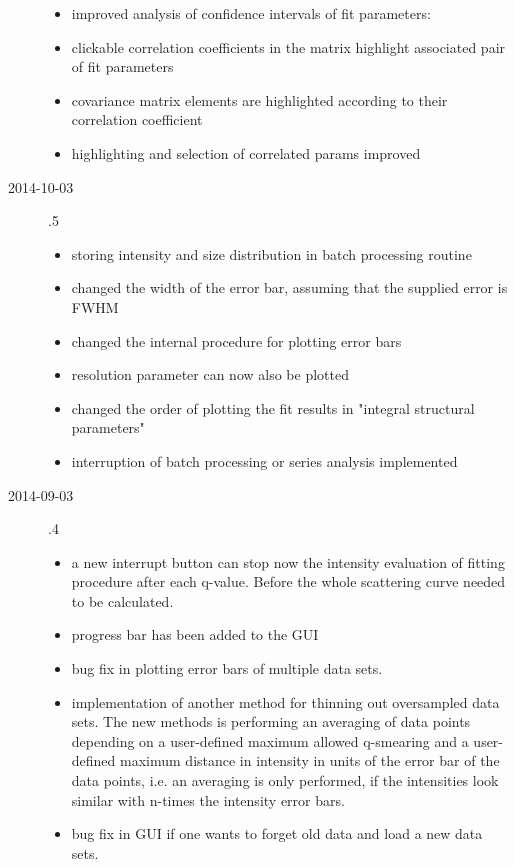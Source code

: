 \begin{description}
\begin{itemize}
        \item improved analysis of confidence intervals of fit parameters:
        \item clickable correlation coefficients in the matrix highlight associated
             pair of fit parameters
        \item covariance matrix elements are highlighted according to their correlation
            coefficient
        \item highlighting and selection of correlated params improved
    \end{itemize}
\item[2014-10-03] .5
    \begin{itemize}
        \item storing intensity and size distribution in batch processing routine
        \item changed the width of the error bar, assuming that the supplied error is FWHM
        \item changed the internal procedure for plotting error bars
        \item resolution parameter can now also be plotted
        \item changed the order of plotting the fit results
            in "integral structural parameters"
        \item interruption of batch processing or series analysis implemented
    \end{itemize}
\item[2014-09-03] .4
    \begin{itemize}
    \item a new interrupt button can stop now the intensity evaluation of fitting
        procedure after each q-value. Before the whole scattering curve needed to be
        calculated.
    \item progress bar has been added to the GUI
    \item bug fix in plotting error bars of multiple data sets.
    \item implementation of another method for thinning out oversampled data sets. The
        new methods is performing an averaging of data points depending on a
        user-defined maximum allowed q-smearing and a user-defined maximum distance
        in intensity in units of the error bar of the data points, i.e. an averaging is
        only performed, if the intensities look similar with n-times the intensity
        error bars.
    \item bug fix in GUI if one wants to forget old data and load a new data sets.

\end{itemize}
\end{description}
